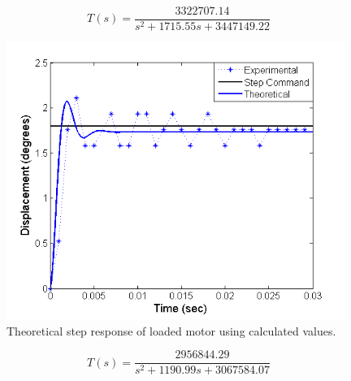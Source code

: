 \documentclass{article}
\theoremstyle{plain}
\theoremstyle{definition}
\theoremstyle{remark}
\begin{document}
\begin{equation}
\label{q3ai_B}
T(s) = \frac{3322707.14}{s^2 + 1715.55 s + 3447149.22}
\end{equation}

\begin{figure}[hbt]
\begin{center}
\includegraphics[width = 11cm]{LoadedStepUnFit.png}
\caption{Theoretical step response of loaded motor using calculated values.}
\label{q3ai_1}
\end{center}
\end{figure}

\begin{equation}
\label{q3ai_C}
T(s) = \frac{2956844.29}{s^2 + 1190.99 s + 3067584.07}
\end{equation}
\end{document}

